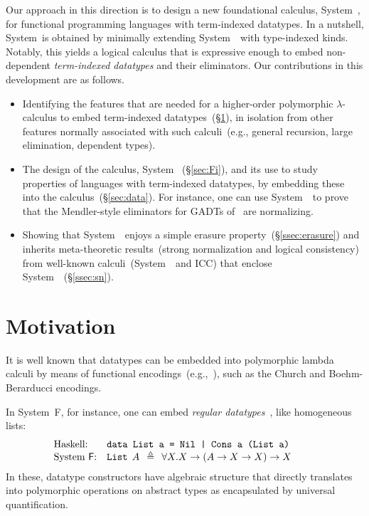 Our approach in this direction is to design a new foundational calculus,
System~\Fi, for functional programming languages with term-indexed
datatypes.  In a nutshell, System~\Fi is obtained by minimally extending
System~\Fw\ with type-indexed kinds.  Notably, this yields a logical
calculus that is expressive enough to embed non-dependent
\emph{term-indexed datatypes} and their eliminators. Our contributions in
this development are as follows.\vspace*{-5pt}
\begin{itemize}
\item 
  Identifying the features that are needed for a higher-order polymorphic
  $\lambda$-calculus to embed term-indexed datatypes~(\S\ref{sec:motiv}),
  in isolation from other features normally associated with such
  calculi~(e.g., general recursion, large elimination, dependent types).
  \vspace*{-1pt}
\item 
  The design of the calculus, System \Fi\ (\S\ref{sec:Fi}), and its use to
  study properties of languages with term-indexed datatypes, by embedding
  these into the calculus~(\S\ref{sec:data}).  For instance, one can use
  System~\Fi\ to prove that the Mendler-style eliminators
  for GADTs of~\cite{AhnShe11} are normalizing.
  \vspace*{-1pt}
\item 
  Showing that System~\Fi\ enjoys a simple erasure
  property~(\S\ref{ssec:erasure}) and inherits meta-theoretic
  results~(strong normalization and logical consistency) from well-known
  calculi~(System~\Fw\ and ICC) that enclose System~\Fi~(\S\ref{ssec:sn}).
\end{itemize}\vspace*{-3pt}


\section{Motivation}
\label{sec:motiv}
It is well known that datatypes can be embedded into polymorphic lambda
calculi by means of functional encodings~(e.g.,~\cite{AbeMatUus03}), such
as the Church and Boehm-Berarducci encodings.

In System~\textsf{F}, for instance, one can embed \emph{regular
datatypes}~\cite{BoehmBerarducci}, like homogeneous lists:
\[\!\!\!\!\!\!\!\!\!
\begin{array}{ll}
\text{Haskell:} & \texttt{data List a = Nil | Cons a (List a)} \\
\text{System \textsf{F}:} & \texttt{{List}}\:\: A\:\:\triangleq\:\:\forall X.X\to(A\to X\to X)\to X ~~\;
\end{array}
\]
In these, datatype constructors have algebraic structure that directly
translates into polymorphic operations on abstract types as encapsulated
by universal quantification.

